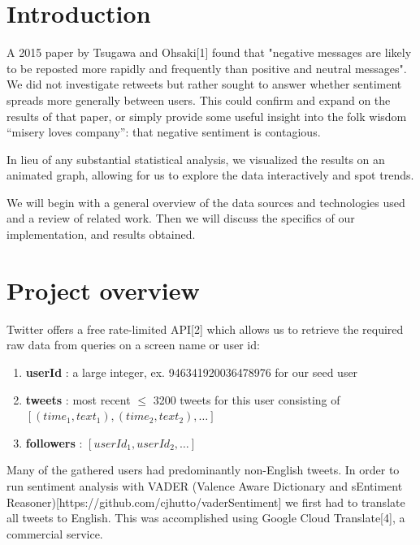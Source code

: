 \documentclass[11pt]{article}
\begin{document}
\section{Introduction}

A 2015 paper by Tsugawa and Ohsaki[1] found that "negative messages are likely to be reposted more rapidly and frequently than positive and neutral messages". We did not investigate retweets but rather sought to answer whether sentiment spreads more generally between users. This could confirm and expand on the results of that paper, or simply provide some useful insight into the folk wisdom “misery loves company”: that negative sentiment is contagious.\newline

In lieu of any substantial statistical analysis, we visualized the results on an animated graph, allowing for us to explore the data interactively and spot trends.\newline

We will begin with a general overview of the data sources and technologies used and a review of related work. Then we will discuss the specifics of our implementation, and results obtained.


\section{Project overview}

Twitter offers a free rate-limited API[2] which allows us to retrieve the required raw data from queries on a screen name or user id:
\begin{enumerate}
    \item \textbf{userId} : a large integer, ex. 946341920036478976 for our seed user
    \item \textbf{tweets} : most recent $\leq$ 3200 tweets for this user consisting of\newline
    $[(time_1, text_1), (time_2, text_2), \dots]$ 
    \item \textbf{followers} : $[userId_1, userId_2, \dots]$
\end{enumerate}

Many of the gathered users had predominantly non-English tweets. In order to run sentiment analysis with VADER (Valence Aware Dictionary and sEntiment Reasoner)[https://github.com/cjhutto/vaderSentiment] we first had to translate all tweets to English. This was accomplished using Google Cloud Translate[4], a commercial service.\newline
\end{document}
